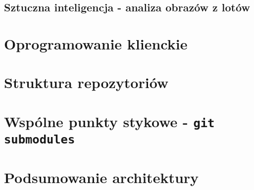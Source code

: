 \subsection{Sztuczna inteligencja - analiza obrazów z lotów}


\section{Oprogramowanie klienckie}

\section{Struktura repozytoriów}

\section{Wspólne punkty stykowe - \texttt{git submodules}}


\section{Podsumowanie architektury}

